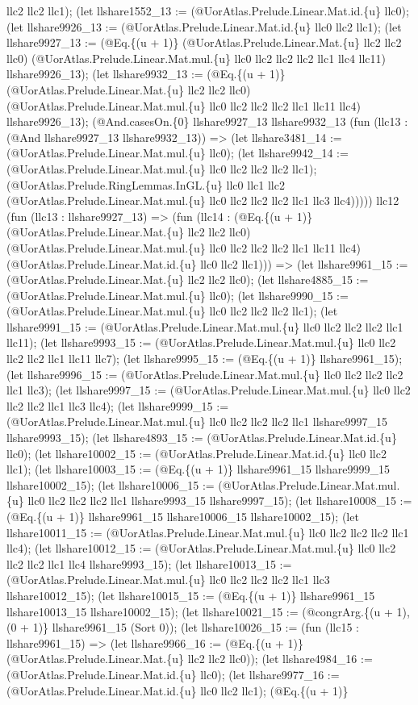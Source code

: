 \documentclass[11pt]{article}
\begin{document}
llc2 llc2 llc1); (let llshare1552\_13 := (@UorAtlas.Prelude.Linear.Mat.id.\{u\} llc0); (let llshare9926\_13 := (@UorAtlas.Prelude.Linear.Mat.id.\{u\} llc0 llc2 llc1); (let llshare9927\_13 := (@Eq.\{(u + 1)\} (@UorAtlas.Prelude.Linear.Mat.\{u\} llc2 llc2 llc0) (@UorAtlas.Prelude.Linear.Mat.mul.\{u\} llc0 llc2 llc2 llc2 llc1 llc4 llc11) llshare9926\_13); (let llshare9932\_13 := (@Eq.\{(u + 1)\} (@UorAtlas.Prelude.Linear.Mat.\{u\} llc2 llc2 llc0) (@UorAtlas.Prelude.Linear.Mat.mul.\{u\} llc0 llc2 llc2 llc2 llc1 llc11 llc4) llshare9926\_13); (@And.casesOn.\{0\} llshare9927\_13 llshare9932\_13 (fun (llc13 : (@And llshare9927\_13 llshare9932\_13)) => (let llshare3481\_14 := (@UorAtlas.Prelude.Linear.Mat.mul.\{u\} llc0); (let llshare9942\_14 := (@UorAtlas.Prelude.Linear.Mat.mul.\{u\} llc0 llc2 llc2 llc2 llc1); (@UorAtlas.Prelude.RingLemmas.InGL.\{u\} llc0 llc1 llc2 (@UorAtlas.Prelude.Linear.Mat.mul.\{u\} llc0 llc2 llc2 llc2 llc1 llc3 llc4))))) llc12 (fun (llc13 : llshare9927\_13) => (fun (llc14 : (@Eq.\{(u + 1)\} (@UorAtlas.Prelude.Linear.Mat.\{u\} llc2 llc2 llc0) (@UorAtlas.Prelude.Linear.Mat.mul.\{u\} llc0 llc2 llc2 llc2 llc1 llc11 llc4) (@UorAtlas.Prelude.Linear.Mat.id.\{u\} llc0 llc2 llc1))) => (let llshare9961\_15 := (@UorAtlas.Prelude.Linear.Mat.\{u\} llc2 llc2 llc0); (let llshare4885\_15 := (@UorAtlas.Prelude.Linear.Mat.mul.\{u\} llc0); (let llshare9990\_15 := (@UorAtlas.Prelude.Linear.Mat.mul.\{u\} llc0 llc2 llc2 llc2 llc1); (let llshare9991\_15 := (@UorAtlas.Prelude.Linear.Mat.mul.\{u\} llc0 llc2 llc2 llc2 llc1 llc11); (let llshare9993\_15 := (@UorAtlas.Prelude.Linear.Mat.mul.\{u\} llc0 llc2 llc2 llc2 llc1 llc11 llc7); (let llshare9995\_15 := (@Eq.\{(u + 1)\} llshare9961\_15); (let llshare9996\_15 := (@UorAtlas.Prelude.Linear.Mat.mul.\{u\} llc0 llc2 llc2 llc2 llc1 llc3); (let llshare9997\_15 := (@UorAtlas.Prelude.Linear.Mat.mul.\{u\} llc0 llc2 llc2 llc2 llc1 llc3 llc4); (let llshare9999\_15 := (@UorAtlas.Prelude.Linear.Mat.mul.\{u\} llc0 llc2 llc2 llc2 llc1 llshare9997\_15 llshare9993\_15); (let llshare4893\_15 := (@UorAtlas.Prelude.Linear.Mat.id.\{u\} llc0); (let llshare10002\_15 := (@UorAtlas.Prelude.Linear.Mat.id.\{u\} llc0 llc2 llc1); (let llshare10003\_15 := (@Eq.\{(u + 1)\} llshare9961\_15 llshare9999\_15 llshare10002\_15); (let llshare10006\_15 := (@UorAtlas.Prelude.Linear.Mat.mul.\{u\} llc0 llc2 llc2 llc2 llc1 llshare9993\_15 llshare9997\_15); (let llshare10008\_15 := (@Eq.\{(u + 1)\} llshare9961\_15 llshare10006\_15 llshare10002\_15); (let llshare10011\_15 := (@UorAtlas.Prelude.Linear.Mat.mul.\{u\} llc0 llc2 llc2 llc2 llc1 llc4); (let llshare10012\_15 := (@UorAtlas.Prelude.Linear.Mat.mul.\{u\} llc0 llc2 llc2 llc2 llc1 llc4 llshare9993\_15); (let llshare10013\_15 := (@UorAtlas.Prelude.Linear.Mat.mul.\{u\} llc0 llc2 llc2 llc2 llc1 llc3 llshare10012\_15); (let llshare10015\_15 := (@Eq.\{(u + 1)\} llshare9961\_15 llshare10013\_15 llshare10002\_15); (let llshare10021\_15 := (@congrArg.\{(u + 1), (0 + 1)\} llshare9961\_15 (Sort 0)); (let llshare10026\_15 := (fun (llc15 : llshare9961\_15) => (let llshare9966\_16 := (@Eq.\{(u + 1)\} (@UorAtlas.Prelude.Linear.Mat.\{u\} llc2 llc2 llc0)); (let llshare4984\_16 := (@UorAtlas.Prelude.Linear.Mat.id.\{u\} llc0); (let llshare9977\_16 := (@UorAtlas.Prelude.Linear.Mat.id.\{u\} llc0 llc2 llc1); (@Eq.\{(u + 1)\} 
\end{document}
